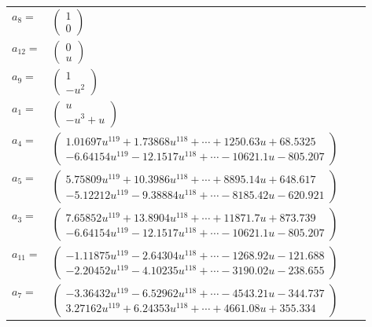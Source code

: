 \documentclass[1p]{elsarticle_modified}
\theoremstyle{definition}
\begin{document}
\begin{tabular}{m{7pt} m{180pt} m{7pt} m{180pt} }
\flushright $a_{8}=$&$\begin{pmatrix}1\\0\end{pmatrix}$ \\
\flushright $a_{12}=$&$\begin{pmatrix}0\\u\end{pmatrix}$ \\
\flushright $a_{9}=$&$\begin{pmatrix}1\\- u^2\end{pmatrix}$ \\
\flushright $a_{1}=$&$\begin{pmatrix}u\\- u^3+u\end{pmatrix}$ \\
\flushright $a_{4}=$&$\begin{pmatrix}1.01697 u^{119}+1.73868 u^{118}+\cdots+1250.63 u+68.5325\\-6.64154 u^{119}-12.1517 u^{118}+\cdots-10621.1 u-805.207\end{pmatrix}$ \\
\flushright $a_{5}=$&$\begin{pmatrix}5.75809 u^{119}+10.3986 u^{118}+\cdots+8895.14 u+648.617\\-5.12212 u^{119}-9.38884 u^{118}+\cdots-8185.42 u-620.921\end{pmatrix}$ \\
\flushright $a_{3}=$&$\begin{pmatrix}7.65852 u^{119}+13.8904 u^{118}+\cdots+11871.7 u+873.739\\-6.64154 u^{119}-12.1517 u^{118}+\cdots-10621.1 u-805.207\end{pmatrix}$ \\
\flushright $a_{11}=$&$\begin{pmatrix}-1.11875 u^{119}-2.64304 u^{118}+\cdots-1268.92 u-121.688\\-2.20452 u^{119}-4.10235 u^{118}+\cdots-3190.02 u-238.655\end{pmatrix}$ \\
\flushright $a_{7}=$&$\begin{pmatrix}-3.36432 u^{119}-6.52962 u^{118}+\cdots-4543.21 u-344.737\\3.27162 u^{119}+6.24353 u^{118}+\cdots+4661.08 u+355.334\end{pmatrix}$ \\

\end{tabular}
\end{document}
